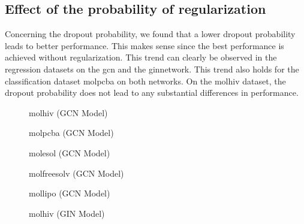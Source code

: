 \subsection{Effect of the probability of regularization}
Concerning the dropout probability, we found that a lower dropout probability leads to better performance. This makes sense since the best performance is achieved without regularization. This trend can clearly be observed in the regression datasets on the \ac{gcn} and the \ac{gin}network. This trend also holds for the classification dataset molpcba on both networks. On the molhiv dataset, the dropout probability does not lead to any substantial differences in performance.
\begin{figure}
    \centering
    \caption{molhiv (GCN Model)}
    \label{fig:gcn-molfreesolv}
\end{figure}

\begin{figure}
    \centering
    \caption{molpcba (GCN Model)}
    \label{fig:gcn-molfreesolv}
\end{figure}

\begin{figure}
    \centering
    \caption{molesol (GCN Model)}
    \label{fig:gcn-molfreesolv}
\end{figure}

\begin{figure}
    \centering
    \caption{molfreesolv (GCN Model)}
    \label{fig:gcn-molfreesolv}
\end{figure}

\begin{figure}
    \centering
    \caption{mollipo (GCN Model)}
    \label{fig:gcn-molfreesolv}
\end{figure}

\begin{figure}
    \centering
    \caption{molhiv (GIN Model)}
    \label{fig:gcn-molfreesolv}
\end{figure}

